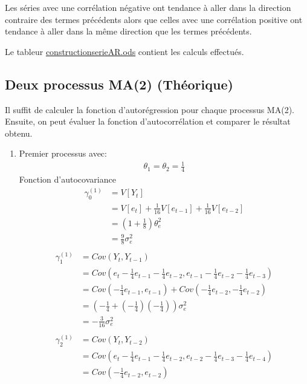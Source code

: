 \documentclass{article}
\begin{document}
Les séries avec une corrélation négative ont tendance à aller dans la direction contraire des termes précédents alors que celles avec une corrélation positive ont tendance à aller dans la même direction que les termes précédents.

Le tableur \url{constructionserieAR.ods} contient les calculs effectués.

\subsection{Deux processus MA(2) (Théorique)}

Il suffit de calculer la fonction d'autorégression pour chaque processus MA(2).
Ensuite, on peut évaluer la fonction d'autocorrélation et comparer le résultat obtenu.

\begin{enumerate}
\item Premier processus avec:
  \begin{align*}
    \theta_1 = \theta_2 = \frac{1}{4}
  \end{align*}
  Fonction d'autocovariance
  \begin{align*}
    \gamma_0^{(1)} &= V[Y_t] \\
    &= V[e_t]+\frac{1}{16}V[e_{t-1}]+\frac{1}{16}V[e_{t-2}] \\
    &= (1+\frac{1}{8})\theta^2_e \\
    &= \frac{9}{8} \sigma^2_e \\
  \end{align*}
  \begin{align*}
    \gamma_1^{(1)} &= Cov(Y_t,Y_{t-1}) \\
    &= Cov(e_t - \frac{1}{4}e_{t-1} - \frac{1}{4}e_{t-2}, e_{t-1} - \frac{1}{4}e_{t-2} - \frac{1}{4}e_{t-3} )\\
    &= Cov(-\frac{1}{4}e_{t-1},e_{t-1}) + Cov(-\frac{1}{4}e_{t-2},-\frac{1}{4}e_{t-2}) \\
    &= (-\frac{1}{4}+(-\frac{1}{4})(-\frac{1}{4})) \sigma^2_e \\
    &= -\frac{3}{16} \sigma^2_e \\
  \end{align*}
  \begin{align*}
    \gamma_2^{(1)} &= Cov(Y_t,Y_{t-2}) \\
    &= Cov(e_t - \frac{1}{4}e_{t-1} - \frac{1}{4}e_{t-2}, e_{t-2} - \frac{1}{4}e_{t-3} - \frac{1}{4}e_{t-4} )\\
    &= Cov(-\frac{1}{4}e_{t-2},e_{t-2}) \\

\end{align*}
\end{enumerate}
\end{document}
